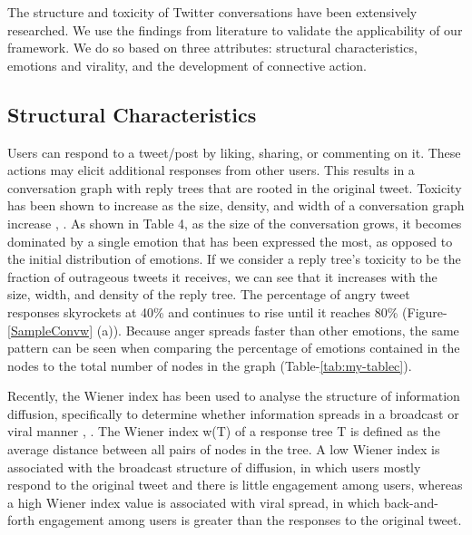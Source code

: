 \documentclass[acmtog]{acmart}
\begin{document}
The structure and toxicity of Twitter conversations have been extensively researched. We use the findings from literature to validate the applicability of our framework. We do so based on three attributes: structural characteristics, emotions and virality, and the development of connective action.
\subsection{Structural Characteristics}
Users can respond to a tweet/post by liking, sharing, or commenting on it. These actions may elicit additional responses from other users. This results in a conversation graph with reply trees that are rooted in the original tweet. Toxicity has been shown to increase as the size, density, and width of a conversation graph increase \cite{kanavos2014conversation}, \cite{saveski2021structure}. As shown in Table 4, as the size of the conversation grows, it becomes dominated by a single emotion that has been expressed the most, as opposed to the initial distribution of emotions. If we consider a reply tree's toxicity to be the fraction of outrageous tweets it receives, we can see that it increases with the size, width, and density of the reply tree. The percentage of angry tweet responses skyrockets at 40\% and continues to rise until it reaches 80\% (Figure-\ref{SampleConvw} (a)). Because anger spreads faster than other emotions, the same pattern can be seen when comparing the percentage of emotions contained in the nodes to the total number of nodes in the graph (Table-\ref{tab:my-tablec}). 

Recently, the Wiener index has been used to analyse the structure of information diffusion, specifically to determine whether information spreads in a broadcast or viral manner \cite{saveski2021structure}, \cite{goel2016structural}. The Wiener index w(T) of a response tree T is defined as the average distance between all pairs of nodes in the tree. A low Wiener index is associated with the broadcast structure of diffusion, in which users mostly respond to the original tweet and there is little engagement among users, whereas a high Wiener index value is associated with viral spread, in which back-and-forth engagement among users is greater than the responses to the original tweet. 
\end{document}
